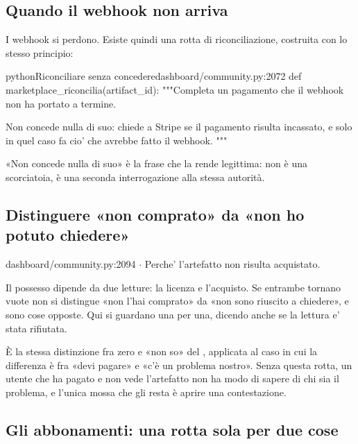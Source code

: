 \subsection{Quando il webhook non arriva}

I webhook si perdono. Esiste quindi una rotta di riconciliazione, costruita
con lo stesso principio:

\begin{codiceInterno}{python}{Riconciliare senza concedere}{dashboard/community.py:2072}
    def marketplace_riconcilia(artifact_id):
        """Completa un pagamento che il webhook non ha portato a termine.

        Non concede nulla di suo: chiede a Stripe se il pagamento risulta
        incassato, e solo in quel caso fa cio' che avrebbe fatto il webhook.
        """
\end{codiceInterno}

\noindent
«Non concede nulla di suo» è la frase che la rende legittima: non è una
scorciatoia, è una seconda interrogazione alla stessa autorità.

\subsection{Distinguere «non comprato» da «non ho potuto chiedere»}

\begin{commento}{dashboard/community.py:2094 $\cdot$ }
Perche' l'artefatto non risulta acquistato.

Il possesso dipende da due letture: la licenza e l'acquisto. Se
entrambe tornano vuote non si distingue «non l'hai comprato» da «non
sono riuscito a chiedere», e sono cose opposte. Qui si guardano una
per una, dicendo anche se la lettura e' stata rifiutata.
\end{commento}

\noindent
È la stessa distinzione fra zero e «non so» del ,
applicata al caso in cui la differenza è fra «devi pagare» e «c'è un
problema nostro». Senza questa rotta, un utente che ha pagato e non vede
l'artefatto non ha modo di sapere di chi sia il problema, e l'unica mossa
che gli resta è aprire una contestazione.

\subsection{Gli abbonamenti: una rotta sola per due cose}

